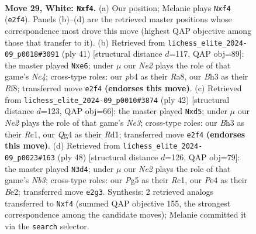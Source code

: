 \documentclass[11pt]{article}
\begin{document}
\begin{figure}[p]
\label{fig:thought-m54}
\end{figure}

\clearpage

\begin{figure}[p]\centering
\begin{subfigure}{0.46\textwidth}\centering
\resizebox{\linewidth}{!}{%
\newchessgame
\chessboard[
  setfen={r1b1k2r/1q4bp/p1npp1p1/4p1P1/1p2PnQP/5P1B/PPPKNB2/R1R5 w - - 2 29},
  showmover=false,
  pgfstyle=straightmove, color=movearrow, markmove={e2-f4}
]}
\caption{}
\end{subfigure}\hfill
\begin{subfigure}{0.46\textwidth}\centering
\resizebox{\linewidth}{!}{%
\newchessgame
\chessboard[
  setfen={r4rk1/1p2ppbp/2p1N1p1/p1n1P3/q1P2PP1/P6P/1P2Q1B1/R1B1R1K1 b - - 0 21},
  showmover=false,
  pgfstyle=straightmove, color=movearrow, markmove={c5-e6}
]}
\caption{}
\end{subfigure}
\\[4pt]
\begin{subfigure}{0.46\textwidth}\centering
\resizebox{\linewidth}{!}{%
\newchessgame
\chessboard[
  setfen={2r1kb1r/1pq2p2/p2pb1p1/3np3/P3P3/4N1Pp/1PP1QP1P/2RRB1K1 w k - 0 22},
  showmover=false,
  pgfstyle=straightmove, color=movearrow, markmove={e3-d5}
]}
\caption{}
\end{subfigure}\hfill
\begin{subfigure}{0.46\textwidth}\centering
\resizebox{\linewidth}{!}{%
\newchessgame
\chessboard[
  setfen={r3r1k1/3q1pb1/1p1p1nb1/1NnP2p1/1BP1p3/1N2P1Pp/2Q1BP1P/2R2RK1 w - - 2 25},
  showmover=false,
  pgfstyle=straightmove, color=movearrow, markmove={b3-d4}
]}
\caption{}
\end{subfigure}
\caption{\textbf{Move 29, White: \texttt{Nxf4}.} (a) Our position; Melanie plays \texttt{Nxf4} (\texttt{e2f4}). Panels (b)--(d) are the retrieved master positions whose correspondence most drove this move (highest QAP objective among those that transfer to it). (b) Retrieved from \texttt{lichess\_elite\_2024-09\_p0018\#3091} (ply 41) [structural distance $d$=117, QAP obj=89]: the master played \texttt{Nxe6}; under $\mu$ our \emph{Ne2} plays the role of that game's \emph{Nc4}; cross-type roles: our \emph{p}b4 as their \emph{R}a8, our \emph{B}h3 as their \emph{R}f8; transferred move \texttt{e2f4} \textbf{(endorses this move)}. (c) Retrieved from \texttt{lichess\_elite\_2024-09\_p0010\#3874} (ply 42) [structural distance $d$=123, QAP obj=66]: the master played \texttt{Nxd5}; under $\mu$ our \emph{Ne2} plays the role of that game's \emph{Ne3}; cross-type roles: our \emph{B}h3 as their \emph{R}c1, our \emph{Q}g4 as their \emph{R}d1; transferred move \texttt{e2f4} \textbf{(endorses this move)}. (d) Retrieved from \texttt{lichess\_elite\_2024-09\_p0023\#163} (ply 48) [structural distance $d$=126, QAP obj=79]: the master played \texttt{N3d4}; under $\mu$ our \emph{Ne2} plays the role of that game's \emph{Nb3}; cross-type roles: our \emph{P}g5 as their \emph{R}c1, our \emph{P}e4 as their \emph{B}e2; transferred move \texttt{e2g3}. Synthesis: 2 retrieved analogs transferred to \texttt{Nxf4} (summed QAP objective 155, the strongest correspondence among the candidate moves); Melanie committed it via the \texttt{search} selector.}

\end{figure}
\end{document}
